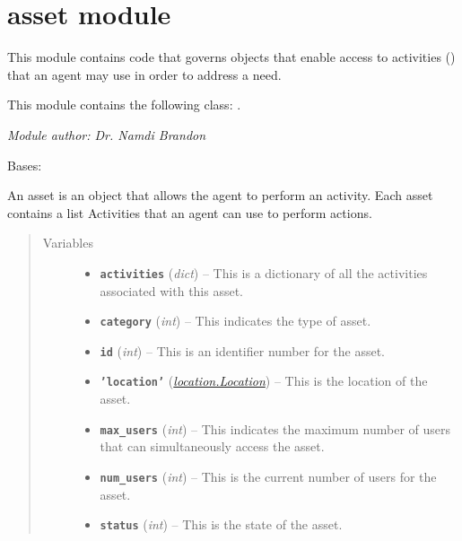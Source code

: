 \documentclass[letterpaper,10pt,english]{sphinxmanual}
\begin{document}
\section{asset module}
\label{asset::doc}\label{asset:module-asset}\label{asset:asset-module}
This module contains code that governs objects that enable access to activities ({\hyperref[activity:activity.Activity]{\emph{}}}) that an agent may use in order to address a need.

This module contains the following class: {\hyperref[asset:asset.Asset]{\emph{}}}.

\emph{Module author: Dr. Namdi Brandon}

\begin{fulllineitems}
\label{asset:asset.Asset}
Bases: 

An asset is an object that allows the agent to perform an activity. Each asset     contains a list Activities that an agent can use to perform actions.
\begin{quote}\begin{description}
\item[{Variables}] \leavevmode\begin{itemize}
\item {} 
\textbf{\texttt{activities}} (\emph{dict}) -- This is a dictionary of all the activities associated with this asset.

\item {} 
\textbf{\texttt{category}} (\emph{int}) -- This indicates the type of asset.

\item {} 
\textbf{\texttt{id}} (\emph{int}) -- This is an identifier number for the asset.

\item {} 
\textbf{\texttt{'location'}} ({\hyperref[location:location.Location]{\emph{\emph{location.Location}}}}) -- This is the location of the asset.

\item {} 
\textbf{\texttt{max\_users}} (\emph{int}) -- This indicates the maximum number of users that can simultaneously access the asset.

\item {} 
\textbf{\texttt{num\_users}} (\emph{int}) -- This is the current number of users for the asset.

\item {} 
\textbf{\texttt{status}} (\emph{int}) -- This is the state of the asset.


\end{itemize}
\end{description}
\end{quote}
\end{fulllineitems}
\end{document}
